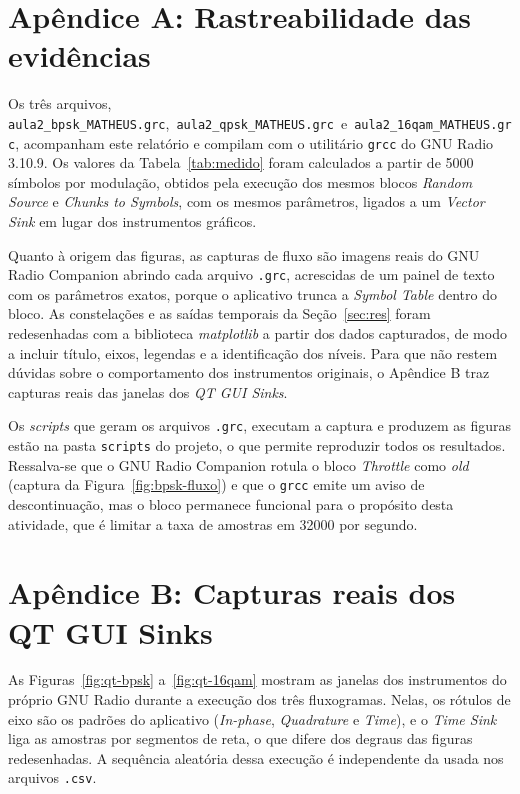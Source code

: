 \clearpage
\section*{Apêndice A: Rastreabilidade das evidências}

Os três arquivos, \texttt{aula2\_bpsk\_MATHEUS.grc},\ \texttt{aula2\_qpsk\_MATHEUS.grc}\ e\ \texttt{aula2\_16qam\_MATHEUS.grc}, acompanham este relatório e compilam com o utilitário \texttt{grcc} do GNU Radio 3.10.9. Os valores da Tabela~\ref{tab:medido} foram calculados a partir de 5000 símbolos por modulação, obtidos pela execução dos mesmos blocos \textit{Random Source} e \textit{Chunks to Symbols}, com os mesmos parâmetros, ligados a um \textit{Vector Sink} em lugar dos instrumentos gráficos.

Quanto à origem das figuras, as capturas de fluxo são imagens reais do GNU Radio Companion abrindo cada arquivo \texttt{.grc}, acrescidas de um painel de texto com os parâmetros exatos, porque o aplicativo trunca a \textit{Symbol Table} dentro do bloco. As constelações e as saídas temporais da Seção~\ref{sec:res} foram redesenhadas com a biblioteca \textit{matplotlib} a partir dos dados capturados, de modo a incluir título, eixos, legendas e a identificação dos níveis. Para que não restem dúvidas sobre o comportamento dos instrumentos originais, o Apêndice B traz capturas reais das janelas dos \textit{QT GUI Sinks}.

Os \textit{scripts} que geram os arquivos \texttt{.grc}, executam a captura e produzem as figuras estão na pasta \texttt{scripts} do projeto, o que permite reproduzir todos os resultados. Ressalva-se que o GNU Radio Companion rotula o bloco \textit{Throttle} como \textit{old} (captura da Figura~\ref{fig:bpsk-fluxo}) e que o \texttt{grcc} emite um aviso de descontinuação, mas o bloco permanece funcional para o propósito desta atividade, que é limitar a taxa de amostras em \SI{32000}{} por segundo.

\section*{Apêndice B: Capturas reais dos QT GUI Sinks}

As Figuras~\ref{fig:qt-bpsk} a~\ref{fig:qt-16qam} mostram as janelas dos instrumentos do próprio GNU Radio durante a execução dos três fluxogramas. Nelas, os rótulos de eixo são os padrões do aplicativo (\textit{In-phase}, \textit{Quadrature} e \textit{Time}), e o \textit{Time Sink} liga as amostras por segmentos de reta, o que difere dos degraus das figuras redesenhadas. A sequência aleatória dessa execução é independente da usada nos arquivos \texttt{.csv}.

